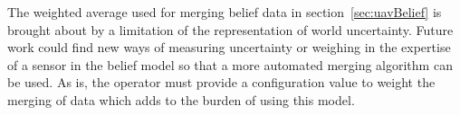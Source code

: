 The weighted average used for merging belief data in section~\ref{sec:uavBelief} is brought about by a limitation of the representation of world uncertainty.  Future work could find new ways of measuring uncertainty or weighing in the expertise of a sensor in the belief model so that a more automated merging algorithm can be used.  As is, the operator must provide a configuration value to weight the merging of data which adds to the burden of using this model.

 





